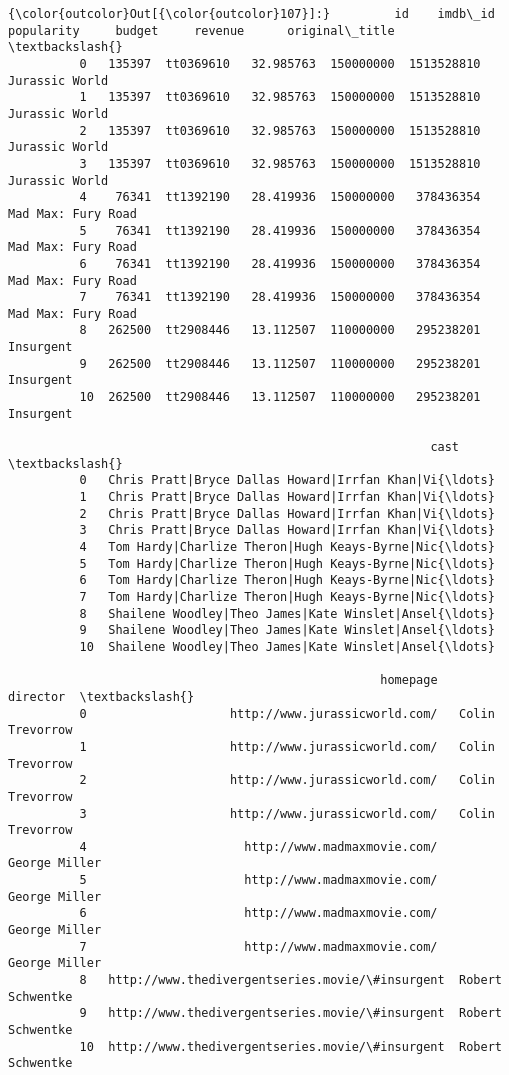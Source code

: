 \documentclass[11pt]{article}
\begin{document}
\begin{Verbatim}[commandchars=\\\{\}]
{\color{outcolor}Out[{\color{outcolor}107}]:}         id    imdb\_id  popularity     budget     revenue      original\_title  \textbackslash{}
          0   135397  tt0369610   32.985763  150000000  1513528810      Jurassic World   
          1   135397  tt0369610   32.985763  150000000  1513528810      Jurassic World   
          2   135397  tt0369610   32.985763  150000000  1513528810      Jurassic World   
          3   135397  tt0369610   32.985763  150000000  1513528810      Jurassic World   
          4    76341  tt1392190   28.419936  150000000   378436354  Mad Max: Fury Road   
          5    76341  tt1392190   28.419936  150000000   378436354  Mad Max: Fury Road   
          6    76341  tt1392190   28.419936  150000000   378436354  Mad Max: Fury Road   
          7    76341  tt1392190   28.419936  150000000   378436354  Mad Max: Fury Road   
          8   262500  tt2908446   13.112507  110000000   295238201           Insurgent   
          9   262500  tt2908446   13.112507  110000000   295238201           Insurgent   
          10  262500  tt2908446   13.112507  110000000   295238201           Insurgent   
          
                                                           cast  \textbackslash{}
          0   Chris Pratt|Bryce Dallas Howard|Irrfan Khan|Vi{\ldots}   
          1   Chris Pratt|Bryce Dallas Howard|Irrfan Khan|Vi{\ldots}   
          2   Chris Pratt|Bryce Dallas Howard|Irrfan Khan|Vi{\ldots}   
          3   Chris Pratt|Bryce Dallas Howard|Irrfan Khan|Vi{\ldots}   
          4   Tom Hardy|Charlize Theron|Hugh Keays-Byrne|Nic{\ldots}   
          5   Tom Hardy|Charlize Theron|Hugh Keays-Byrne|Nic{\ldots}   
          6   Tom Hardy|Charlize Theron|Hugh Keays-Byrne|Nic{\ldots}   
          7   Tom Hardy|Charlize Theron|Hugh Keays-Byrne|Nic{\ldots}   
          8   Shailene Woodley|Theo James|Kate Winslet|Ansel{\ldots}   
          9   Shailene Woodley|Theo James|Kate Winslet|Ansel{\ldots}   
          10  Shailene Woodley|Theo James|Kate Winslet|Ansel{\ldots}   
          
                                                    homepage          director  \textbackslash{}
          0                    http://www.jurassicworld.com/   Colin Trevorrow   
          1                    http://www.jurassicworld.com/   Colin Trevorrow   
          2                    http://www.jurassicworld.com/   Colin Trevorrow   
          3                    http://www.jurassicworld.com/   Colin Trevorrow   
          4                      http://www.madmaxmovie.com/     George Miller   
          5                      http://www.madmaxmovie.com/     George Miller   
          6                      http://www.madmaxmovie.com/     George Miller   
          7                      http://www.madmaxmovie.com/     George Miller   
          8   http://www.thedivergentseries.movie/\#insurgent  Robert Schwentke   
          9   http://www.thedivergentseries.movie/\#insurgent  Robert Schwentke   
          10  http://www.thedivergentseries.movie/\#insurgent  Robert Schwentke   
          

\end{Verbatim}
\end{document}
